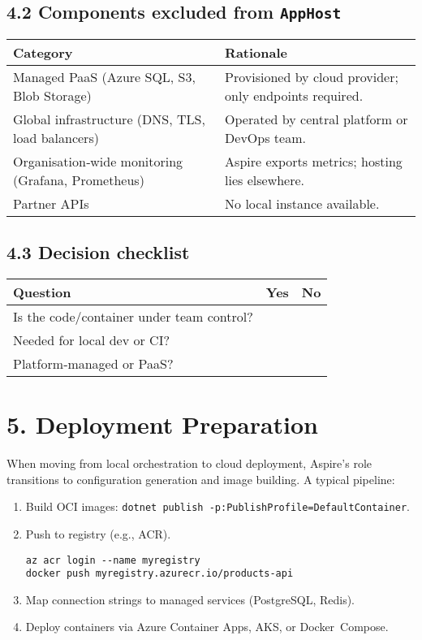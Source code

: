 \documentclass[table]{article}
\newcommand{\yes}{\textcolor{pgreen}{\faCheckCircle}}
\newcommand{\no}{\textcolor{pred}{\faTimesCircle}}
\begin{document}
\subsection*{4.2 Components excluded from \texttt{AppHost}}
\begin{tabularx}{\linewidth}{@{}lX@{}}
\toprule
Category & Rationale \\\midrule
Managed PaaS (Azure SQL, S3, Blob Storage) & Provisioned by cloud provider; only endpoints required.\\
Global infrastructure (DNS, TLS, load balancers) & Operated by central platform or DevOps team.\\
Organisation‑wide monitoring (Grafana, Prometheus) & Aspire exports metrics; hosting lies elsewhere.\\
Partner APIs & No local instance available.\\
\bottomrule
\end{tabularx}

\subsection*{4.3 Decision checklist}
\begin{tabularx}{\linewidth}{@{}l>{\centering\arraybackslash}m{1.5cm}>{\centering\arraybackslash}m{1.5cm}@{}}
\toprule
Question & Yes & No \\\midrule
Is the code/container under team control? & \yes & \no \\
Needed for local dev or CI? & \yes & \no \\
Platform‑managed or PaaS? & \no & \yes \\
\bottomrule
\end{tabularx}

\section*{5. \faUpload\enspace Deployment Preparation}
When moving from local orchestration to cloud deployment, Aspire’s role transitions to configuration generation and image building.  A typical pipeline:

\begin{enumerate}
  \item Build OCI images: \verb|dotnet publish -p:PublishProfile=DefaultContainer|.
  \item Push to registry (e.g., ACR).  
\begin{verbatim}
az acr login --name myregistry
docker push myregistry.azurecr.io/products-api
\end{verbatim}
  \item Map connection strings to managed services (PostgreSQL, Redis).
  \item Deploy containers via Azure Container Apps, AKS, or Docker Compose.
\end{enumerate}
\end{document}
